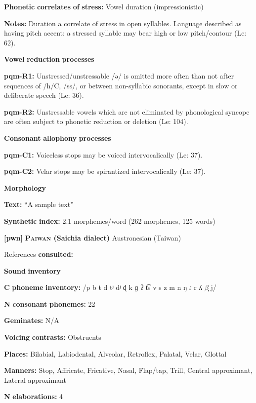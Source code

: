 \textbf{Phonetic} \textbf{correlates} \textbf{of} \textbf{stress:} Vowel duration (impressionistic)

\textbf{Notes:} Duration a correlate of stress in open syllables. Language described as having pitch accent: a stressed syllable may bear high or low pitch/contour (Le\citealt{Sourd1993}: 62).

\textbf{Vowel} \textbf{reduction} \textbf{processes}

\textbf{pqm-R1:} Unstressed/unstressable /ə/ is omitted more often than not after sequences of /h/C, /ss/, or between non-syllabic sonorants, except in slow or deliberate speech (Le\citealt{Sourd1993}: 36).

\textbf{pqm-R2:} Unstressable vowels which are not eliminated by phonological syncope are often subject to phonetic reduction or deletion (Le\citealt{Sourd1993}: 104).

\textbf{Consonant} \textbf{allophony} \textbf{processes}

\textbf{pqm-C1:} Voiceless stops may be voiced intervocalically (Le\citealt{Sourd1993}: 37).

\textbf{pqm-C2:} Velar stops may be spirantized intervocalically (Le\citealt{Sourd1993}: 37).

\textbf{Morphology}

\textbf{Text:} “A sample text” \citep[55-58]{Leavitt1996}

\textbf{Synthetic} \textbf{index:} 2.1 morphemes/word (262 morphemes, 125 words)

\textbf{[pwn]}   \textbf{\textsc{Paiwan} \textbf{(Saichia} \textbf{dialect)}}  Austronesian (Taiwan)

References \textbf{consulted:} \citet{Chang2006}

\textbf{Sound} \textbf{inventory}

\textbf{C} \textbf{phoneme} \textbf{inventory:} /p b t d tʲ dʲ ɖ k ɡ ʔ t͡s v s z m n ŋ ɾ r ʎ $\beta ̞$ j/

\textbf{N} \textbf{consonant} \textbf{phonemes:} 22

\textbf{Geminates:} N/A

\textbf{Voicing} \textbf{contrasts:} Obstruents

\textbf{Places:} Bilabial, Labiodental, Alveolar, Retroflex, Palatal, Velar, Glottal

\textbf{Manners:} Stop, Affricate, Fricative, Nasal, Flap/tap, Trill, Central approximant, Lateral approximant

\textbf{N} \textbf{elaborations:} 4

